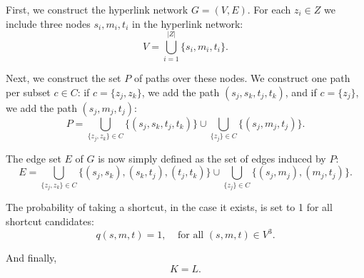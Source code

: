 \documentclass[11pt,letterpaper]{article}
\begin{document}
First, we construct the hyperlink network $G=(V,E)$.
For each $z_i \in Z$ we include three nodes $s_i,m_i,t_i$ in the hyperlink network:
\begin{equation}
V=\bigcup_{i=1}^{|Z|} \{s_i, m_i, t_i\}.
\end{equation}

Next, we construct the set $P$ of paths over these nodes. We construct one path per subset $c \in C$:
if $c=\{z_j,z_k\}$, we add the path $(s_j,s_k,t_j,t_k)$, and if $c=\{z_j\}$, we add the path $(s_j,m_j,t_j)$:
\begin{equation}
P = \bigcup_{\{z_j,z_k\} \in C} \{(s_j, s_k, t_j, t_k)\} \cup \bigcup_{\{z_j\} \in C} \{(s_j, m_j, t_j)\}.
\end{equation}

The edge set $E$ of $G$ is now simply defined as the set of edges induced by $P$:
\begin{equation}
E = \bigcup_{\{z_j,z_k\} \in C} \{(s_j,s_k), (s_k,t_j), (t_j,t_k)\} \cup \bigcup_{\{z_j\} \in C} \{(s_j,m_j), (m_j,t_j)\}.
\end{equation}

The probability of taking a shortcut, in the case it exists, is set to 1 for all shortcut candidates:
\begin{equation}
q(s,m,t) = 1, \;\;\;\; \mbox{for all $(s,m,t) \in V^3$}.
\end{equation}

And finally,
\begin{equation}
K=L.
\end{equation}
\end{document}
